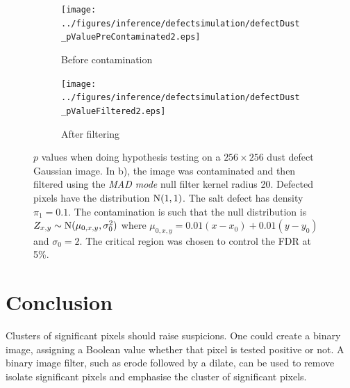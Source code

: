 \begin{figure}[htp]
  \centering
  \begin{subfigure}[b]{0.49\textwidth}
    \texttt{[image: ../figures/inference/defectsimulation/defectDust\_pValuePreContaminated2.eps]}
    \caption{Before contamination}
  \end{subfigure}
  \begin{subfigure}[b]{0.49\textwidth}
    \texttt{[image: ../figures/inference/defectsimulation/defectDust\_pValueFiltered2.eps]}
    \caption{After filtering}
  \end{subfigure}
  \caption{$p$ values when doing hypothesis testing on a $256 \times 256$ dust defect Gaussian image. In b), the image was contaminated and then filtered using the \emph{MAD mode} null filter kernel radius 20. Defected pixels have the distribution $\operatorname{N}(1,1)$. The salt defect has density $\pi_1 = 0.1$. The contamination is such that the null distribution is $Z_{x,y}\sim\operatorname{N}(\mu_{0,x,y},\sigma_0^2)$ where $\mu_{0,x,y} = 0.01 (x-x_0) + 0.01 (y-y_0)$ and $\sigma_0=2$. The critical region was chosen to control the FDR at 5\%.}
\end{figure}

\section{Conclusion}

Clusters of significant pixels should raise suspicions. One could create a binary image, assigning a Boolean value whether that pixel is tested positive or not. A binary image filter, such as erode followed by a dilate, can be used to remove isolate significant pixels and emphasise the cluster of significant pixels.